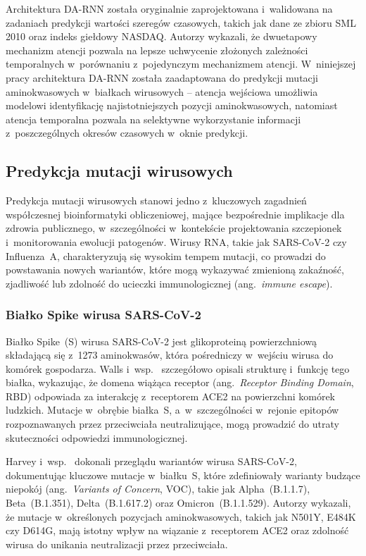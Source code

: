 Architektura DA-RNN została oryginalnie zaprojektowana i~walidowana na zadaniach predykcji wartości szeregów czasowych, takich jak dane ze zbioru SML 2010 oraz indeks giełdowy NASDAQ. Autorzy wykazali, że dwuetapowy mechanizm atencji pozwala na lepsze uchwycenie złożonych zależności temporalnych w~porównaniu z~pojedynczym mechanizmem atencji. W~niniejszej pracy architektura DA-RNN została zaadaptowana do predykcji mutacji aminokwasowych w~białkach wirusowych -- atencja wejściowa umożliwia modelowi identyfikację najistotniejszych pozycji aminokwasowych, natomiast atencja temporalna pozwala na selektywne wykorzystanie informacji z~poszczególnych okresów czasowych w~oknie predykcji.

\subsection{Predykcja mutacji wirusowych}
\label{sec:predykcja-mutacji}

Predykcja mutacji wirusowych stanowi jedno z~kluczowych zagadnień współczesnej bioinformatyki obliczeniowej, mające bezpośrednie implikacje dla zdrowia publicznego, w~szczególności w~kontekście projektowania szczepionek i~monitorowania ewolucji patogenów. Wirusy RNA, takie jak SARS-CoV-2 czy Influenza~A, charakteryzują się wysokim tempem mutacji, co prowadzi do powstawania nowych wariantów, które mogą wykazywać zmienioną zakaźność, zjadliwość lub zdolność do ucieczki immunologicznej (ang.~\textit{immune escape}).

\subsubsection{Białko Spike wirusa SARS-CoV-2}

Białko Spike~(S) wirusa SARS-CoV-2 jest glikoproteiną powierzchniową składającą się z~1273 aminokwasów, która pośredniczy w~wejściu wirusa do komórek gospodarza. Walls i~wsp.~\cite{walls2020spike} szczegółowo opisali strukturę i~funkcję tego białka, wykazując, że domena wiążąca receptor (ang.~\textit{Receptor Binding Domain}, RBD) odpowiada za interakcję z~receptorem ACE2 na powierzchni komórek ludzkich. Mutacje w~obrębie białka~S, a~w~szczególności w~rejonie epitopów rozpoznawanych przez przeciwciała neutralizujące, mogą prowadzić do utraty skuteczności odpowiedzi immunologicznej.

Harvey i~wsp.~\cite{harvey2021variants} dokonali przeglądu wariantów wirusa SARS-CoV-2, dokumentując kluczowe mutacje w~białku~S, które zdefiniowały warianty budzące niepokój (ang.~\textit{Variants of Concern}, VOC), takie jak Alpha~(B.1.1.7), Beta~(B.1.351), Delta~(B.1.617.2) oraz Omicron~(B.1.1.529). Autorzy wykazali, że mutacje w~określonych pozycjach aminokwasowych, takich jak N501Y, E484K czy D614G, mają istotny wpływ na wiązanie z~receptorem ACE2 oraz zdolność wirusa do unikania neutralizacji przez przeciwciała.

